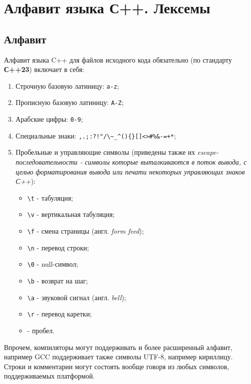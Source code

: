 \section{Алфавит языка С++. Лексемы}

\subsection{Алфавит}

Алфавит языка C++ для файлов исходного кода обязательно (по стандарту
\textbf{С++23}) включает в себя:

\begin{enumerate}
\item
  Строчную базовую латиницу: \texttt{a-z};
\item
  Прописную базовую латиницу: \texttt{A-Z};
\item
  Арабские цифры: \texttt{0-9};
\item
  Специальные знаки:
  \texttt{,.;:?!\textquotesingle{}"\textbar{}/\textbackslash{}\textasciitilde{}\_\^{}()\{\}{[}{]}\textless{}\textgreater{}\#\%\&-=+*};
\item
  Пробельные и управляющие символы (приведены также их
  \emph{escape-последовательности - символы которые выталкиваются в
  поток вывода, с целью форматирования вывода или печати некоторых
  управляющих знаков С++}):

  \begin{itemize}
  \item
    \texttt{\textbackslash{}t} - табуляция;
  \item
    \texttt{\textbackslash{}v} - вертикальная табуляция;
  \item
    \texttt{\textbackslash{}f} - смена страницы (англ. \emph{form
    feed});
  \item
    \texttt{\textbackslash{}n} - перевод строки;
  \item
    \texttt{\textbackslash{}0} - null-символ;
  \item
    \texttt{\textbackslash{}b} - возврат на шаг;
  \item
    \texttt{\textbackslash{}a} - звуковой сигнал (англ. \emph{bell});
  \item
    \texttt{\textbackslash{}r} - перевод каретки;
  \item
    \texttt{} - пробел.
  \end{itemize}
\end{enumerate}

Впрочем, компиляторы могут поддерживать и более расширенный алфавит,
например GCC поддерживает также символы UTF-8, например кириллицу.
Строки и комментарии могут состоять вообще говоря из любых символов,
поддерживаемых платформой.

